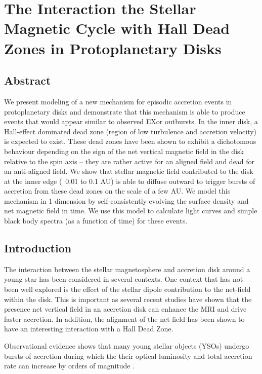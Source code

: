 \chapter{The Interaction the Stellar Magnetic Cycle with Hall Dead Zones in Protoplanetary Disks}
\label{hall}





\section{Abstract}
We present modeling of a new mechanism for episodic accretion events in protoplanetary disks and demonstrate that this mechanism is able to produce events that would appear similar to observed EXor outbursts.  In the inner disk, a Hall-effect dominated dead zone (region of low turbulence and accretion velocity) is expected to exist.  These dead zones have been shown to exhibit a dichotomous behaviour depending on the sign of the net vertical magnetic field in the disk relative to the spin axis -- they are rather active for an aligned field and dead for an anti-aligned field.  We show that stellar magnetic field contributed to the disk at the inner edge (~0.01 to 0.1 AU) is able to diffuse outward to trigger bursts of accretion from these dead zones on the scale of a few AU.  We model this mechanism in 1 dimension by self-consistently evolving the surface density and net magnetic field in time.  We use this model to calculate light curves and simple black body spectra (as a function of time) for these events. 





\section{Introduction}
The interaction between the stellar magnetosphere and accretion disk around a young star has been considered in several contexts.  One context that has not been well explored is the effect of the stellar dipole contribution to the net-field within the disk.  This is important as several recent studies have shown that the presence net vertical field in an accretion disk can enhance the MRI and drive faster accretion.  In addition, the alignment of the net field has been shown to have an interesting interaction with a Hall Dead Zone.   

Observational evidence shows that many young stellar objects (YSOs) undergo bursts of accretion during which the their optical luminosity and total accretion rate can increase by orders of magnitude \citep{herbig77, hartmann96}.  

